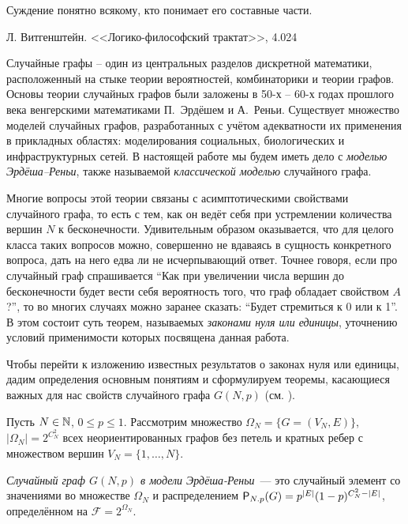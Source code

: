     \epigraph{Суждение понятно всякому, кто понимает его составные части.}{Л. Витгенштейн. <<Логико-философский трактат>>, 4.024}
    Случайные графы -- один из центральных разделов дискретной математики, расположенный на стыке теории вероятностей, комбинаторики и теории графов.
    Основы теории случайных графов были заложены в 50-х -- 60-х годах прошлого века венгерскими математиками П.~Эрдёшем и А.~Реньи.
    Существует множество моделей случайных графов, разработанных с учётом адекватности их применения в прикладных областях: моделирования социальных, биологических и инфраструктурных сетей. 
    В настоящей работе мы будем иметь дело с \textit{моделью Эрдёша--Реньи}, также называемой \textit{классической моделью} случайного графа.
    
    Многие вопросы этой теории связаны с асимптотическими свойствами случайного графа, то есть с тем, как он ведёт себя при устремлении количества вершин $N$ к бесконечности.
    Удивительным образом оказывается, что для целого класса таких вопросов можно, совершенно не вдаваясь в сущность конкретного вопроса, дать на него едва ли не исчерпывающий ответ.
    Точнее говоря, если про случайный граф спрашивается ``Как при увеличении числа вершин до бесконечности будет вести себя вероятность того, что граф обладает свойством $A$?'', то во многих случаях можно заранее сказать: ``Будет стремиться к 0 или к 1''.
    В этом состоит суть теорем, называемых \textit{законами нуля или единицы}, уточнению условий применимости которых посвящена данная работа.
    
    Чтобы перейти к изложению известных результатов о законах нуля или единицы, дадим определения основным понятиям и сформулируем теоремы, касающиеся важных для нас свойств случайного графа $G(N,p)$ (см. \cite{survey2015}).
    
    Пусть $N \in \N$, $0 \leq p \leq 1$. Рассмотрим множество $\Omega_N = \{G = (V_N , E)\}$, $|\Omega_N| = 2^{C_N^2}$ всех неориентированных графов без петель и кратных ребер с множеством вершин $V_N = \{1, \ldots, N \}$.
    
    
  \Def \textit{Случайный граф $G(N, p)$  в модели Эрдёша-Реньи}~--- это случайный элемент со значениями во множестве $\Omega_N$ и распределением $\P_{N.p}(G) = p^{|E|}(1-p)^{C_N^2-|E|}$, определённом на $\mathscr{F}=2^{\Omega_N}$.
  
